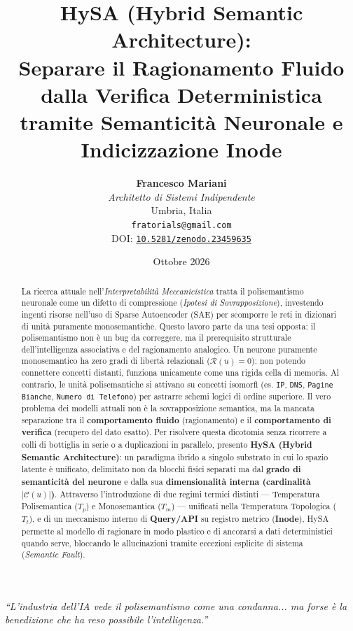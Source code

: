 \documentclass[11pt,a4paper]{article}
\title{\vspace{-0.8cm}\textbf{\LARGE HySA (Hybrid Semantic Architecture): \\ \Large Separare il Ragionamento Fluido dalla Verifica Deterministica \\ tramite Semanticità Neuronale e Indicizzazione Inode}}
\author{
    \textbf{Francesco Mariani} \\
    \textit{Architetto di Sistemi Indipendente} \\
    Umbria, Italia \\
    \texttt{fratorials@gmail.com} \\
    {\footnotesize DOI: \href{https://doi.org/10.5281/zenodo.23459635}{\texttt{10.5281/zenodo.23459635}}} \quad {\footnotesize ORCID: \href{https://orcid.org/0009-0008-1319-3573}{\texttt{0009-0008-1319-3573}}}
}
\date{Ottobre 2026}
\theoremstyle{definition}
\begin{document}
\maketitle

\begin{center}
    \vspace{-0.35cm}
    \textit{``L'industria dell'IA vede il polisemantismo come una condanna... ma forse è la benedizione che ha reso possibile l'intelligenza.''}
    \vspace{0.35cm}
\end{center}

\begin{abstract}
\noindent La ricerca attuale nell'\textit{Interpretabilità Meccanicistica} tratta il polisemantismo neuronale come un difetto di compressione (\textit{Ipotesi di Sovrapposizione}), investendo ingenti risorse nell'uso di Sparse Autoencoder (SAE) per scomporre le reti in dizionari di unità puramente monosemantiche. Questo lavoro parte da una tesi opposta: il polisemantismo non è un bug da correggere, ma il prerequisito strutturale dell'intelligenza associativa e del ragionamento analogico. Un neurone puramente monosemantico ha zero gradi di libertà relazionali ($\mathcal{R}(u)=0$): non potendo connettere concetti distanti, funziona unicamente come una rigida cella di memoria. Al contrario, le unità polisemantiche si attivano su concetti isomorfi (es. \texttt{IP}, \texttt{DNS}, \texttt{Pagine Bianche}, \texttt{Numero di Telefono}) per astrarre schemi logici di ordine superiore. Il vero problema dei modelli attuali non è la sovrapposizione semantica, ma la mancata separazione tra il \textbf{comportamento fluido} (ragionamento) e il \textbf{comportamento di verifica} (recupero del dato esatto). Per risolvere questa dicotomia senza ricorrere a colli di bottiglia in serie o a duplicazioni in parallelo, presento \textbf{HySA (Hybrid Semantic Architecture)}: un paradigma ibrido a singolo substrato in cui lo spazio latente è unificato, delimitato non da blocchi fisici separati ma dal \textbf{grado di semanticità del neurone} e dalla sua \textbf{dimensionalità interna (cardinalità $|\mathcal{C}(u)|$)}. Attraverso l'introduzione di due regimi termici distinti — Temperatura Polisemantica ($T_p$) e Monosemantica ($T_m$) — unificati nella Temperatura Topologica ($T_t$), e di un meccanismo interno di \textbf{Query/API} su registro metrico (\textbf{Inode}), HySA permette al modello di ragionare in modo plastico e di ancorarsi a dati deterministici quando serve, bloccando le allucinazioni tramite eccezioni esplicite di sistema (\textit{Semantic Fault}).
\vspace{0.35cm}
\end{abstract}
\end{document}

